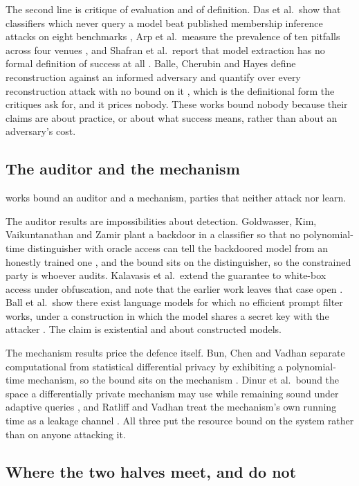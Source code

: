 The second line is critique of evaluation and of definition. Das et al.\ show that
classifiers which never query a model beat published membership inference attacks
on eight benchmarks \cite{DZT25}, Arp et al.\ measure the prevalence of ten
pitfalls across four venues \cite{AQPWPWCR22}, and Shafran et al.\ report that
model extraction has no formal definition of success at all \cite{SSEP24}. Balle,
Cherubin and Hayes define reconstruction against an informed adversary and quantify
over every reconstruction attack with no bound on it \cite{BCH22}, which is the
definitional form the critiques ask for, and it prices nobody. These works bound
nobody because their claims are about practice, or about what success means,
rather than about an adversary's cost.

\subsection{The auditor and the mechanism}

\AuditorBound{} works bound an auditor and \MechanismBound{} a mechanism, parties
that neither attack nor learn.

The auditor results are impossibilities about detection. Goldwasser, Kim,
Vaikuntanathan and Zamir plant a backdoor in a classifier so that no polynomial-time
distinguisher with oracle access can tell the backdoored model from an honestly
trained one \cite{GKVZ22}, and the bound sits on the distinguisher, so the
constrained party is whoever audits. Kalavasis et al.\ extend the guarantee to
white-box access under obfuscation, and note that the earlier work leaves that case
open \cite{KKOSVZ24}. Ball et al.\ show there exist language models for which no
efficient prompt filter works, under a construction in which the model shares a
secret key with the attacker \cite{BGGKRR26}. The claim is existential and about
constructed models.

The mechanism results price the defence itself. Bun, Chen and Vadhan separate
computational from statistical differential privacy by exhibiting a polynomial-time
mechanism, so the bound sits on the mechanism \cite{BCV16}. Dinur et al.\ bound the
space a differentially private mechanism may use while remaining sound under
adaptive queries \cite{DSWZ23}, and Ratliff and Vadhan treat the mechanism's own
running time as a leakage channel \cite{RV24}. All three put the resource bound on
the system rather than on anyone attacking it.

\subsection{Where the two halves meet, and do not}

